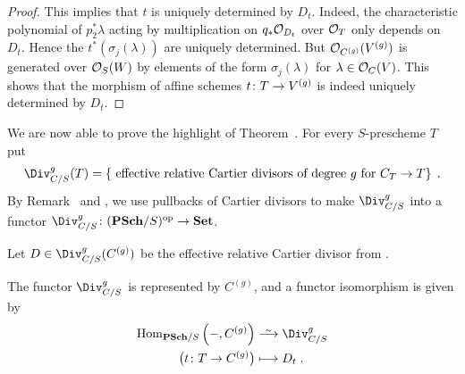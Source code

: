 \documentclass[a4paper,parskip=half,numbers=enddot, DIV=12]{scrreprt}
\begin{document}
\begin{proof}
	 This implies that $t$ is uniquely determined by $D_t$. Indeed, the characteristic polynomial of $p_2^*\lambda$ acting by multiplication on $q_*\mathcal{O}_{D_t}$ over $\mathcal{O}_T$ only depends on $D_t$. Hence the $t^*(\sigma_j(\lambda))$ are uniquely determined. But $\mathcal{O}_{C^{(g)}}(V^{(g)})$ is generated over $\mathcal{O}_S(W)$ by elements of the form $\sigma_j(\lambda)$ for $\lambda\in\mathcal{O}_C(V)$. This shows that the morphism of affine schemes $t\colon T\morphism V^{(g)}$ is indeed uniquely determined by $D_t$.
\end{proof}
We are now able to prove the highlight of Theorem~. For every $S$-prescheme $T$ put 
\begin{align*}
	\Div_{C/S}^g(T)=\left\{\text{ effective relative Cartier divisors of degree $g$ for }C_T\to T\right\}\;.
\end{align*}
By Remark~ and , we use pullbacks of Cartier divisors to make $\Div_{C/S}^g$ into a functor $\Div_{C/S}^g\colon (\cat{PSch}/S)^\op\morphism\cat{Set}$.
\setcounter{thm}{11}
\begin{thm}[end]
	Let $D\in \Div_{C/S}^g(C^{(g)})$ be the  effective relative Cartier divisor from .
	\begin{alphanumerate}\setcounter{enumi}{5}
		\item The functor $\Div_{C/S}^g$ is represented by $C^{(g)}$, and a functor isomorphism is given by
		\begin{align*}
			\Hom_{\cat{PSch}/S}\left(-,C^{(g)}\right)&\isomorphism\Div_{C/S}^g\\
			\big(t\colon T\to C^{(g)}\big)&\longmapsto D_t\;.
		\end{align*}
	\end{alphanumerate}
\end{thm}
\end{document}
